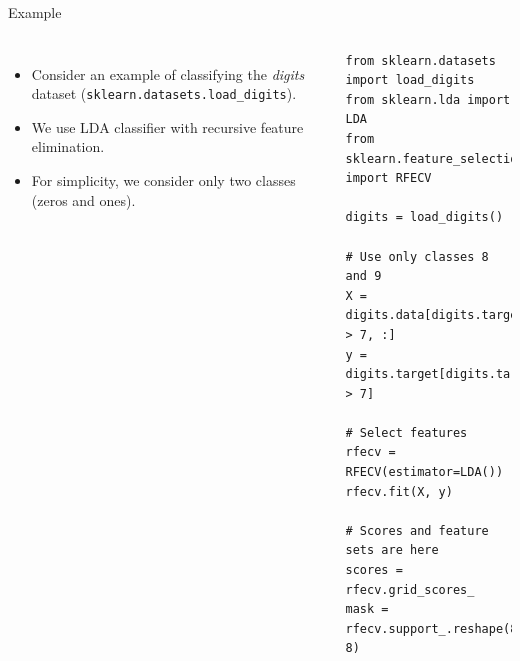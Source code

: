 \documentclass[10pt, aspectratio=169]{beamer} %
\begin{document}
\begin{frame}[fragile,allowframebreaks=0.8]{Example}
\begin{columns}
\begin{itemize}
\item Consider an example of classifying the \emph{digits} dataset (\verb+sklearn.datasets.load_digits+).
\item We use LDA classifier with recursive feature elimination.
\item For simplicity, we consider only two classes (zeros and ones).
\end{itemize}
\begin{lstlisting}
from sklearn.datasets import load_digits
from sklearn.lda import LDA
from sklearn.feature_selection import RFECV

digits = load_digits()

# Use only classes 8 and 9
X = digits.data[digits.target > 7, :]
y = digits.target[digits.target > 7]

# Select features
rfecv = RFECV(estimator=LDA())
rfecv.fit(X, y)

# Scores and feature sets are here
scores = rfecv.grid_scores_
mask = rfecv.support_.reshape(8, 8)
\end{lstlisting}


\end{columns}
\end{frame}
\end{document}
